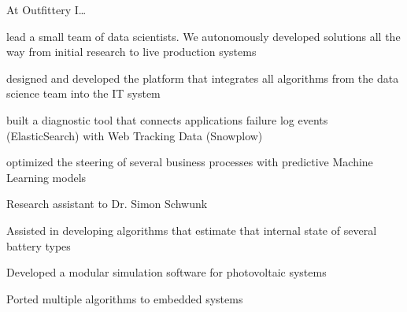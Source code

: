 \documentclass[]{deedy-resume-openfont}
\begin{document}
\begin{minipage}[t]{0.62\textwidth}
\vspace{10pt} %
At Outfittery I\ldots
\vspace{3pt} %
\begin{tightemize}
\item lead a small team of data scientists. We autonomously developed solutions all the way from initial research to live production systems
\item designed and developed the platform that integrates all algorithms from the data science team into the IT system
\item built a diagnostic tool that connects applications failure log events (ElasticSearch) with Web Tracking Data (Snowplow)
\item optimized the steering of several business processes with predictive Machine Learning models
\end{tightemize}
\sectionsep


\begin{tightemize}
\item Research assistant to Dr. Simon Schwunk
\item Assisted in developing algorithms that estimate that internal state of several battery types
\item Developed a modular simulation software for photovoltaic systems
\item Ported multiple algorithms to embedded systems
\end{tightemize}
\sectionsep



\end{minipage}
\end{document}
